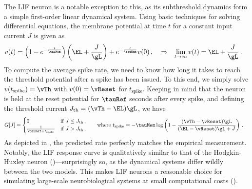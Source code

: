 The LIF neuron is a notable exception to this, as its subthreshold dynamics form a simple first-order linear dynamical system.
Using basic techniques for solving differential equations, the membrane potential \vMem at time $t$ for a constant input current $J$ is given as
\begin{align}
	v(t) &= \left(1 - e^{-\frac{t}{\tauMem}} \right) \left( \EL + \frac{J}{\gL} \right) + e^{-\frac{t}{\tauMem}} v(0) \,, &&\Rightarrow & \lim_{t \to \infty} v(t) &= \EL + \frac{J}{\gL} \,.
\end{align}
To compute the average spike rate, we need to know how long it takes to reach the threshold potential after a spike has been issued.
To this end, we simply solve $v(t_\mathrm{spike}) = \vTh$ with $v(0) = \vReset$ for $t_\mathrm{spike}$.
Keeping in mind that the neuron is held at the reset potential for $\tauRef$ seconds after every spike, and defining the threshold current $J_\mathrm{th} = (\vTh - \EL) \gL$, we have
\begin{align}
	\begin{aligned}
	G[J] &= \begin{cases}
		0 & \text{if } J \leq J_\mathrm{th} \,, \\
		\frac{1}{\tauRef + t_\mathrm{spike}} & \text{if } J > J_\mathrm{th} \,,
	\end{cases} & \quad
	\text{where }
	t_\mathrm{spike} &=
		-\tauMem \log\left(1 - \frac{(\vTh - \vReset) \gL}{(\EL - \vReset) \gL + J} \right) \,.
	\end{aligned}
	\label{eqn:lif_response_curve}
\end{align}
As depicted in , the predicted rate perfectly matches the empirical measurement.
Notably, the LIF response curve is qualitatively similar to that of the Hodgkin-Huxley neuron ()---surprisingly so, as the dynamical systems differ wildly between the two models.
This makes LIF neurons a reasonable choice for simulating large-scale neurobiological systems at small computational costs (\cite{meunier2002playing}).

